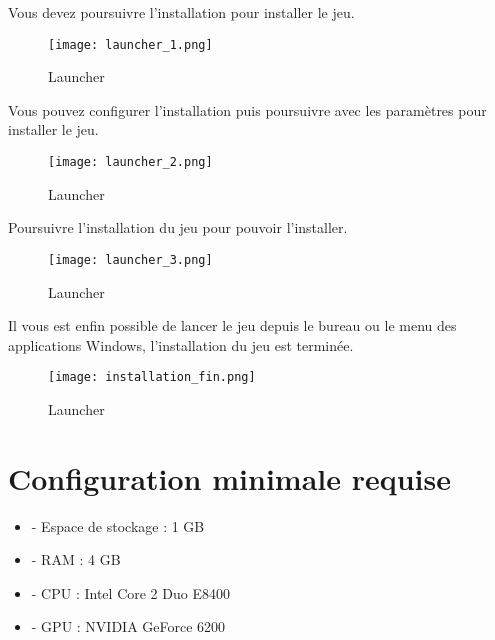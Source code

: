 \documentclass[
	article,			%
	11pt,				%
	oneside,			%
	a4paper,			%
	chapter=TITLE,
	french,			%
	sumario=tradicional
	]{base_nt}
\begin{document}
\newpage

Vous devez poursuivre l'installation pour installer le jeu.

\vspace{0cm}
\begin{figure}[ht]
	\caption{Launcher}
	\centering
	\texttt{[image: launcher\_1.png]}
	
\end{figure}

\newpage

Vous pouvez configurer l'installation puis poursuivre avec les paramètres pour installer le jeu.

\vspace{0cm}
\begin{figure}[ht]
	\caption{Launcher}
	\centering
	\texttt{[image: launcher\_2.png]}
	
\end{figure}

\newpage

Poursuivre l'installation du jeu pour pouvoir l'installer.

\vspace{0cm}
\begin{figure}[ht]
	\caption{Launcher}
	\centering
	\texttt{[image: launcher\_3.png]}
	
\end{figure}

\newpage

Il vous est enfin possible de lancer le jeu depuis le bureau ou le menu des applications Windows, l'installation du jeu est terminée.

\vspace{0cm}
\begin{figure}[ht]
	\caption{Launcher}
	\centering
	\texttt{[image: installation\_fin.png]}
	
\end{figure}

\newpage

\section{Configuration minimale requise}

\begin{itemize}
    \item - Espace de stockage : 1 GB
    \item - RAM : 4 GB
    \item - CPU : Intel Core 2 Duo E8400
    \item - GPU : NVIDIA GeForce 6200
\end{itemize}
\end{document}
